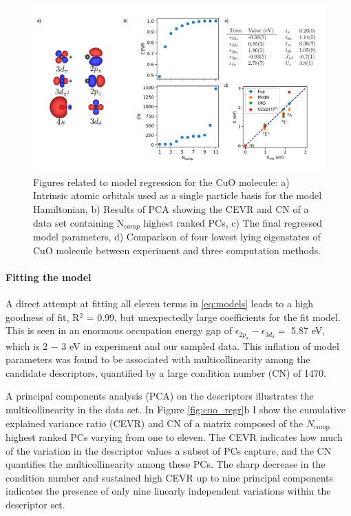 \documentclass[12pt]{article}
\begin{document}
\begin{figure}
\centering
\includegraphics[width=1.0\linewidth]{./figs/cuo_regr_2.pdf}
\caption{Figures related to model regression for the CuO molecule: a) Intrinsic atomic orbitals used as a single particle basis for the model Hamiltonian, b) Results of PCA showing the CEVR and CN of a data set containing N$_{comp}$  highest ranked PCs, c) The final regressed model parameters, d) Comparison of four lowest lying eigenstates of CuO molecule between experiment and three computation methods.}
\label{fig:cuo_regr}
\end{figure}

\vspace{-10pt}
\paragraph{Fitting the model}
A direct attempt at fitting all eleven terms in \eqref{eq:models} leads to a high goodness of fit, R$^2$ = 0.99, but unexpectedly large coefficients for the fit model.
This is seen in an enormous occupation energy gap of $\epsilon_{2p_\pi} - \epsilon_{3d_\delta} = $ 5.87 eV, which is 2 $-$ 3 eV in experiment and our sampled data.
This inflation of model parameters was found to be associated with multicollinearity among the candidate descriptors, quantified by a large condition number (CN) of 1470.

A principal components analysis (PCA) on the descriptors illustrates the multicollinearity in the data set.
In Figure \eqref{fig:cuo_regr}b I show the cumulative explained variance ratio (CEVR) and CN of a matrix composed of the $N_\text{comp}$ highest ranked PCs varying from one to eleven.
The CEVR indicates how much of the variation in the descriptor values a subset of PCs capture, and the CN quantifies the multicollinearity among these PCs.
The sharp decrease in the condition number and sustained high CEVR up to nine principal components indicates the presence of only nine linearly independent variations within the descriptor set.
\end{document}
